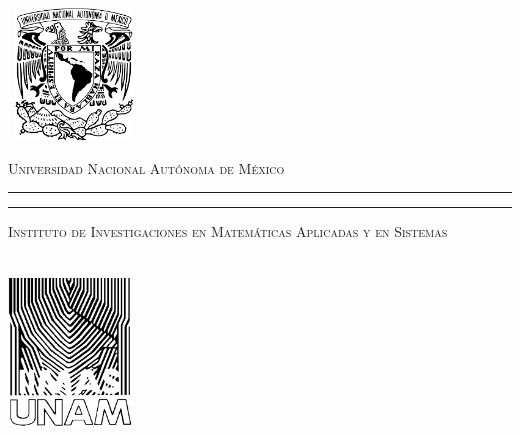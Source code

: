 \documentclass[letterpaper,12pt,oneside]{book}
\theoremstyle{plain}
\numberwithin{theorem}{section}
\begin{document}
    \begin{titlepage}
        \thispagestyle{empty}
        \begin{minipage}[c][0.17\textheight][c]{0.25\textwidth}
            \begin{center}
                \includegraphics[width=3.5cm, height=3.5cm]{logo-UNAM.png}
            \end{center}
        \end{minipage}
        \begin{minipage}[c][0.195\textheight][t]{0.75\textwidth}
            \begin{center}
                \vspace{0.3cm}
                \textsc{\large Universidad Nacional Aut\'onoma de M\'exico}\\[0.5cm]
                \vspace{0.3cm}
                \hrule height2.5pt
                \vspace{.2cm}
                \hrule height1pt
                \vspace{.8cm}
                \textsc{Instituto de Investigaciones en Matemáticas Aplicadas y en Sistemas}\\[0.5cm] %
            \end{center}
        \end{minipage}
        \begin{minipage}[c][0.81\textheight][t]{0.25\textwidth}
            \vspace*{5mm}
            \begin{center}
                \hskip2.0mm
                \vrule width1pt height13cm 
                \vspace{5mm}
                \hskip2pt
                \vrule width2.5pt height13cm
                \hskip2mm
                \vrule width1pt height13cm \\
                \vspace{5mm}
                \includegraphics[height=4.0cm]{logo-IIMAS.png}
            \end{center}
        \end{minipage}
        \begin{minipage}[c][0.81\textheight][t]{0.75\textwidth}
            \begin{center}
                \vspace{1cm}


\end{center}
\end{minipage}
\end{titlepage}
\end{document}
